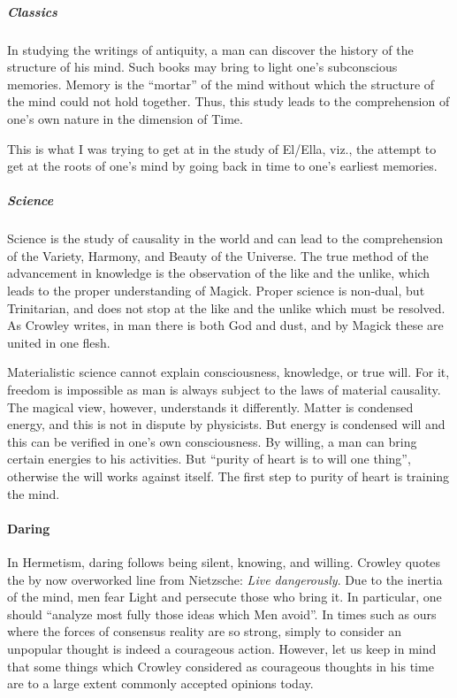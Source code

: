 \subparagraph{Classics}
In studying the writings of antiquity, a man can discover the history of the structure of his mind. Such books may bring to light one's subconscious memories. Memory is the “mortar” of the mind without which the structure of the mind could not hold together. Thus, this study leads to the comprehension of one's own nature in the dimension of Time.

This is what I was trying to get at in the study of El/Ella, viz., the attempt to get at the roots of one's mind by going back in time to one's earliest memories.

\subparagraph{Science}
Science is the study of causality in the world and can lead to the comprehension of the Variety, Harmony, and Beauty of the Universe. The true method of the advancement in knowledge is the observation of the like and the unlike, which leads to the proper understanding of Magick. Proper science is non-dual, but Trinitarian, and does not stop at the like and the unlike which must be resolved. As Crowley writes, in man there is both God and dust, and by Magick these are united in one flesh.

Materialistic science cannot explain consciousness, knowledge, or true will. For it, freedom is impossible as man is always subject to the laws of material causality. The magical view, however, understands it differently. Matter is condensed energy, and this is not in dispute by physicists. But energy is condensed will and this can be verified in one's own consciousness. By willing, a man can bring certain energies to his activities. But “purity of heart is to will one thing”, otherwise the will works against itself. The first step to purity of heart is training the mind.

\paragraph{Daring}
In Hermetism, daring follows being silent, knowing, and willing. Crowley quotes the by now overworked line from Nietzsche: \emph{Live dangerously}. Due to the inertia of the mind, men fear Light and persecute those who bring it. In particular, one should “analyze most fully those ideas which Men avoid”. In times such as ours where the forces of consensus reality are so strong, simply to consider an unpopular thought is indeed a courageous action. However, let us keep in mind that some things which Crowley considered as courageous thoughts in his time are to a large extent commonly accepted opinions today.

